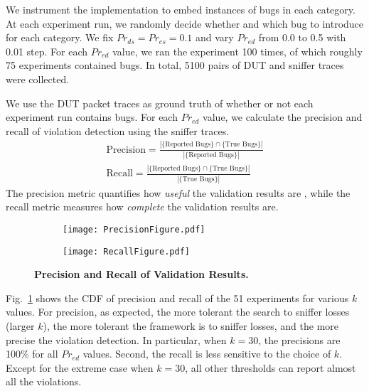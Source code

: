 We instrument the \ns{} implementation to embed instances of bugs in each
category. At each experiment run, we randomly decide whether and which bug to
introduce for each category. We fix $Pr_{ds}=Pr_{es}=0.1$ and vary $Pr_{ed}$
from 0.0 to 0.5 with 0.01 step. For each $Pr_{ed}$ value, we ran the experiment
100 times, of which roughly 75 experiments contained bugs. In total, 5100 pairs of
DUT and sniffer traces were collected.


We use the DUT packet traces as ground truth of whether or not each experiment
run contains bugs.
For each $Pr_{ed}$ value, we calculate the precision and recall of violation
detection using the sniffer traces.%
\begin{align}
  \text{Precision} = \frac{\left\vert \{\text{Reported Bugs}\} \cap \{\text{True Bugs}\}\right\vert}{\left\vert
  \{\text{Reported Bugs}\}\right\vert}\\
  \text{Recall} = \frac{\left\vert \{\text{Reported Bugs}\} \cap \{\text{True Bugs}\}\right\vert}{\left\vert
  \{\text{True Bugs}\}\right\vert}
\end{align}%
The precision metric quantifies how \textit{useful} the validation results are ,
while the recall metric measures how \textit{complete} the validation results
are.

\begin{figure}[t!]
  \centering
  \begin{subfigure}{0.48\textwidth}
    \texttt{[image: PrecisionFigure.pdf]}
  \end{subfigure}
  \begin{subfigure}{0.48\textwidth}
    \texttt{[image: RecallFigure.pdf]}
  \end{subfigure}
  \caption{\textbf{Precision and Recall of Validation Results.}}
  \label{fig:precision}
\end{figure}

Fig.~\ref{fig:precision} shows the CDF of precision and recall of the 51
experiments for various $k$ values. For precision, as expected, the more
tolerant the search to sniffer losses (larger $k$), the more tolerant the
framework is to sniffer losses, and the more precise the violation detection. In
particular, when $k=30$, the precisions are 100\% for all $Pr_{ed}$ values.
Second, the recall is less sensitive to the choice of $k$.  Except for the
extreme case when $k=30$, all other thresholds can report almost all the
violations.
